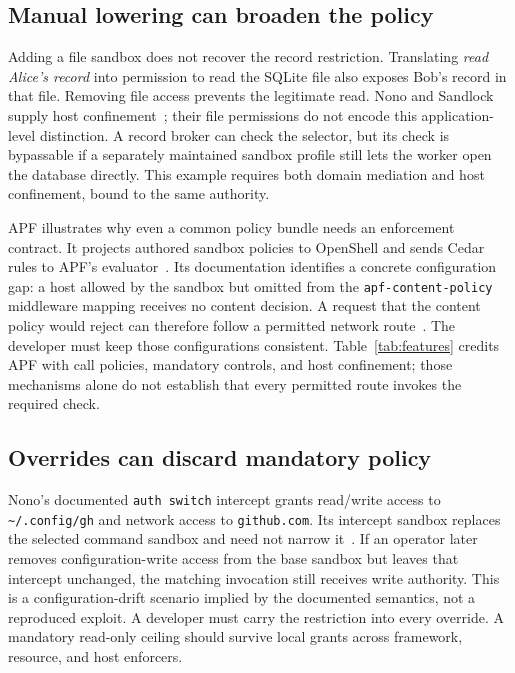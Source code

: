 \documentclass[letterpaper,twocolumn,10pt]{article}
\newcommand{\code}[1]{\texttt{#1}}
\begin{document}
\subsection{Manual lowering can broaden the policy}

Adding a file sandbox does not recover the record restriction. Translating
\emph{read Alice's record} into permission to read the SQLite file also exposes
Bob's record in that file. Removing file access prevents the legitimate read.
Nono and Sandlock supply host confinement~\cite{nono,sandlock}; their file
permissions do not encode this application-level distinction. A record broker
can check the selector, but its check is bypassable if a separately maintained
sandbox profile still lets the worker open the database directly. This example
requires both domain mediation and host confinement, bound to the same authority.

APF illustrates why even a common policy bundle needs an enforcement contract.
It projects authored sandbox policies to OpenShell and sends Cedar rules to
APF's evaluator~\cite{apfprojection}. Its documentation identifies a concrete
configuration gap: a host allowed by the sandbox but omitted from the
\code{apf-content-policy} middleware mapping receives no content decision.
A request that the content policy would reject can therefore follow a permitted
network route~\cite{apfcoverage}. The developer must keep those configurations
consistent. Table~\ref{tab:features} credits APF with call policies, mandatory
controls, and host confinement; those mechanisms alone do not establish that
every permitted route invokes the required check.

\subsection{Overrides can discard mandatory policy}

Nono's documented \code{auth switch} intercept grants read/write access to
\code{\textasciitilde/.config/gh} and network access to \code{github.com}. Its intercept
sandbox replaces the selected command sandbox and need not narrow
it~\cite{nono}. If an operator later removes configuration-write access from
the base sandbox but leaves that intercept unchanged, the matching invocation
still receives write authority. This is a configuration-drift scenario implied
by the documented semantics, not a reproduced exploit. A developer must carry
the restriction into every override. A mandatory read-only ceiling should
survive local grants across framework, resource, and host enforcers.
\end{document}
